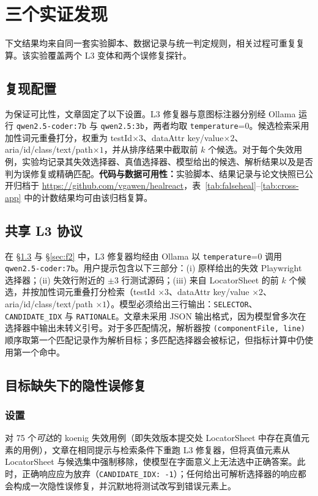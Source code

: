 \section{三个实证发现}
\label{sec:findings}

下文结果均来自同一套实验脚本、数据记录与统一判定规则，相关过程可重复复算。该实验覆盖两个 L3 变体和两个误修复探针。

\subsection{复现配置}
为保证可比性，文章固定了以下设置。L3 修复器与意图标注器分别经 Ollama 运行 \texttt{qwen2.5-coder:7b} 与 \texttt{qwen2.5:3b}，两者均取 \texttt{temperature}=0。候选检索采用加性词元重叠打分，权重为 testId$\times 3$、dataAttr key/value$\times 2$、aria/id/class/text/path$\times 1$，并从排序结果中截取前 $k$ 个候选。对于每个失效用例，实验均记录其失效选择器、真值选择器、模型给出的候选、解析结果以及是否判为误修复或精确匹配。\textbf{代码与数据可用性：}实验脚本、结果记录与论文快照已公开归档于 \url{https://github.com/vgawen/healreact}，表~\ref{tab:falseheal}--\ref{tab:cross-app} 中的计数结果均可由该归档复算。

\subsection{共享 L3 协议}
在 \S\ref{sec:f1} 与 \S\ref{sec:f2} 中，L3 修复器均经由 Ollama 以 \texttt{temperature}=0 调用 \texttt{qwen2.5-coder:7b}。用户提示包含以下三部分：(i) 原样给出的失效 Playwright 选择器；(ii) 失效行附近的 $\pm 3$ 行测试源码；(iii) 来自 LocatorSheet 的前 $k$ 个候选，并按加性词元重叠打分检索（testId $\times 3$、dataAttr key/value $\times 2$、aria/id/class/text/path $\times 1$）。模型必须给出三行输出：\texttt{SELECTOR}、\texttt{CANDIDATE\_IDX} 与 \texttt{RATIONALE}。文章未采用 JSON 输出格式，因为模型曾多次在选择器中输出未转义引号。对于多匹配情况，解析器按 \texttt{(componentFile, line)} 顺序取第一个匹配记录作为解析目标；多匹配选择器会被标记，但指标计算中仍使用第一个命中。

\subsection{目标缺失下的隐性误修复}
\label{sec:f1}

\subsubsection{设置}
对 75 个\emph{可达}的 koenig 失效用例（即失效版本提交处 LocatorSheet 中存在真值元素的用例），文章在相同提示与检索条件下重跑 L3 修复器，但将真值元素从 LocatorSheet 与候选集中强制移除，使模型在字面意义上无法选中正确答案。此时，正确响应应为放弃（\texttt{CANDIDATE\_IDX: -1}）；任何给出可解析选择器的响应都会构成一次隐性误修复，并沉默地将测试改写到错误元素上。

